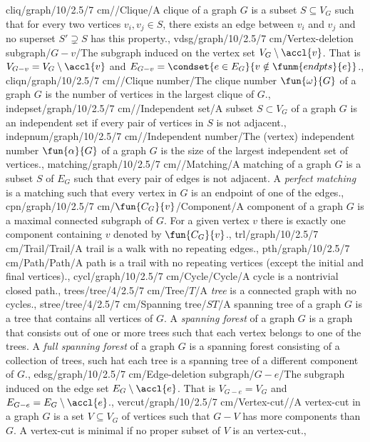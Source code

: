 cliq/graph/10/2.5/7 cm/{}/{Clique}/{A clique of a graph $G$ is a subset $S\subseteq V_G$ such that for every two vertices $v_i,v_j\in S$, there exists an edge between $v_i$ and $v_j$ and no superset $S'\supsetneq S$ has this property.},
vdsg/graph/10/2.5/7 cm/{Vertex-deletion subgraph}/{$G-v$}/{The subgraph induced on the vertex set $V_G\setminus\accl{v}$. That is $V_{G-v}=V_G\setminus\accl{v}$ and $E_{G-v}=\condset{e\in E_G}{v\notin\funm{endpts}{e}}$.},
cliqn/graph/10/2.5/7 cm/{}/{Clique number}/{The clique number $\fun{\omega}{G}$ of a graph $G$ is the number of vertices in the largest clique of $G$.},
indepset/graph/10/2.5/7 cm/{}/{Independent set}/{A subset $S\subset V_G$ of a graph $G$ is an independent set if every pair of vertices in $S$ is not adjacent.},
indepnum/graph/10/2.5/7 cm/{}/{Independent number}/{The (vertex) independent number $\fun{\alpha}{G}$ of a graph $G$ is the size of the largest independent set of vertices.},
matching/graph/10/2.5/7 cm/{}/{Matching}/{A matching of a graph $G$ is a subset $S$ of $E_G$ such that every pair of edges is not adjacent. A \emph{perfect matching} is a matching such that every vertex in $G$ is an endpoint of one of the edges.},
cpn/graph/10/2.5/7 cm/{$\fun{C_G}{v}$}/{Component}/{A component of a graph $G$ is a maximal connected subgraph of $G$. For a given vertex $v$ there is exactly one component containing $v$ denoted by $\fun{C_G}{v}$.},
trl/graph/10/2.5/7 cm/{Trail}/{Trail}/{A trail is a walk with no repeating edges.},
pth/graph/10/2.5/7 cm/{Path}/{Path}/{A path is a trail with no repeating vertices (except the initial and final vertices).},
cycl/graph/10/2.5/7 cm/{Cycle}/{Cycle}/{A cycle is a nontrivial closed path.},
trees/tree/4/2.5/7 cm/Tree/$T$/{A \emph{tree} is a connected graph with no cycles.},
stree/tree/4/2.5/7 cm/{Spanning tree}/$ST$/{A spanning tree of a graph $G$ is a tree that contains all vertices of $G$. A \emph{spanning forest} of a graph $G$ is a graph that consists out of one or more trees such that each vertex belongs to one of the trees. A \emph{full spanning forest} of a graph $G$ is a spanning forest consisting of a collection of trees, such hat each tree is a spanning tree of a different component of $G$.},
edsg/graph/10/2.5/7 cm/{Edge-deletion subgraph}/{$G-e$}/{The subgraph induced on the edge set $E_G\setminus\accl{e}$. That is $V_{G-e}=V_G$ and $E_{G-e}=E_G\setminus\accl{e}$.},
vercut/graph/10/2.5/7 cm/{Vertex-cut}/{}/{A vertex-cut in a graph $G$ is a set $V\subseteq V_G$ of vertices such that $G-V$ has more components than $G$. A vertex-cut is minimal if no proper subset of $V$ is an vertex-cut.},
